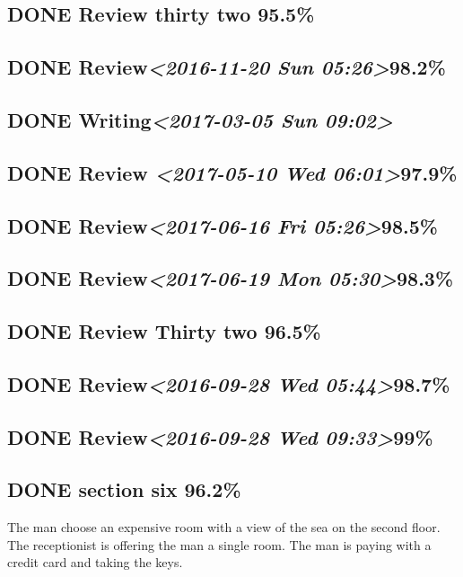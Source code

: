 \documentclass[11pt]{ctexart}
\begin{document}
\subsection{{\bfseries\sffamily DONE} Review thirty two 95.5\%}
\label{sec:org13eff78}

\subsection{{\bfseries\sffamily DONE} Review\textit{<2016-11-20 Sun 05:26>}98.2\%}
\label{sec:orgd60cabd}
\subsection{{\bfseries\sffamily DONE} Writing\textit{<2017-03-05 Sun 09:02>}}
\label{sec:org11459c6}
\subsection{{\bfseries\sffamily DONE} Review \textit{<2017-05-10 Wed 06:01>}97.9\%}
\label{sec:org739a91d}
\subsection{{\bfseries\sffamily DONE} Review\textit{<2017-06-16 Fri 05:26>}98.5\%}
\label{sec:orgdc68816}
\subsection{{\bfseries\sffamily DONE} Review\textit{<2017-06-19 Mon 05:30>}98.3\%}
\label{sec:orgfd648bf}
\subsection{{\bfseries\sffamily DONE} Review Thirty two 96.5\%}
\label{sec:org45334eb}
\subsection{{\bfseries\sffamily DONE} Review\textit{<2016-09-28 Wed 05:44>}98.7\%}
\label{sec:org5f9e049}
\subsection{{\bfseries\sffamily DONE} Review\textit{<2016-09-28 Wed 09:33>}99\%}
\label{sec:org1299ca4}

\subsection{{\bfseries\sffamily DONE} section six 96.2\%}
\label{sec:orge51b81b}
The man choose an expensive room with a view of the sea on the second floor.
The receptionist is offering the man a single room.
The man is paying with a credit card and taking the keys.
\end{document}
